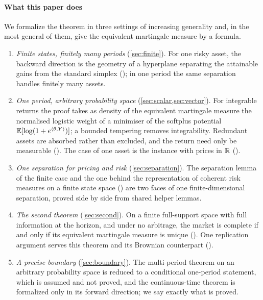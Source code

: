 \documentclass[11pt]{article}
\begin{document}
\paragraph{What this paper does}
We formalize the theorem in three settings of increasing generality and, in the most general of them,
give the equivalent martingale measure by a formula.
\begin{enumerate}[label=(\arabic*)]
\item \emph{Finite states, finitely many periods} (\cref{sec:finite}). For one risky asset, the backward
  direction is the geometry of a hyperplane separating the attainable gains from the standard simplex
  (); in one period the same separation handles finitely many assets.
\item \emph{One period, arbitrary probability space} (\cref{sec:scalar,sec:vector}). For integrable
  returns the proof takes as density of the equivalent martingale measure the normalised logistic weight of
  a minimiser of the softplus potential $\mathbb{E}[\log(1+e^{\langle\theta,Y\rangle})]$; a bounded tempering removes
  integrability. Redundant assets are absorbed rather than excluded, and the return need only be measurable
  (). The case of one asset is the instance
  with prices in $\mathbb{R}$ ().
\item \emph{One separation for pricing and risk} (\cref{sec:separation}). The separation lemma of the
  finite case and the one behind the representation of coherent risk measures on a finite state space
  () are two faces of one finite-dimensional separation, proved side by side
  from shared helper lemmas.
\item \emph{The second theorem} (\cref{sec:second}). On a finite full-support space with full information at the
  horizon, and under no arbitrage, the market is complete if and only if its equivalent martingale
  measure is unique (). One replication argument serves this theorem and its
  Brownian counterpart ().
\item \emph{A precise boundary} (\cref{sec:boundary}). The multi-period theorem on an arbitrary probability space is
  reduced to a conditional one-period statement, which is assumed and not proved, and the continuous-time theorem is
  formalized only in its forward direction; we say exactly what is proved.
\end{enumerate}
\end{document}
